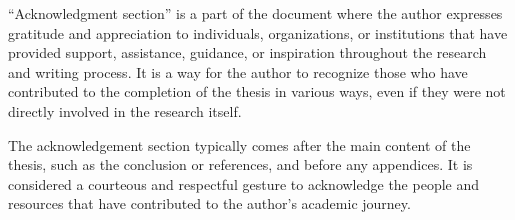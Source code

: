 \begin{acknowledgement}
``Acknowledgment section'' is a part of the document where the author expresses gratitude and appreciation to individuals, organizations, or institutions that have provided support, assistance, guidance, or inspiration throughout the research and writing process. It is a way for the author to recognize those who have contributed to the completion of the thesis in various ways, even if they were not directly involved in the research itself.

The acknowledgement section typically comes after the main content of the thesis, such as the conclusion or references, and before any appendices. It is considered a courteous and respectful gesture to acknowledge the people and resources that have contributed to the author's academic journey.
\end{acknowledgement}

